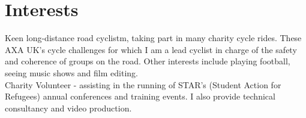 \documentclass[11pt]{article}
\begin{document}
\section*{Interests}

Keen long-distance road cyclistm, taking part in many charity cycle rides. These AXA UK's cycle challenges for which I am a lead cyclist in charge of the safety and coherence of groups on the road. Other interests include playing football, seeing music shows and film editing.\\

\noindent Charity Volunteer - assisting in the running of STAR's (Student Action for Refugees) annual conferences and training events.
I also provide technical consultancy and video production.

\end{document}
